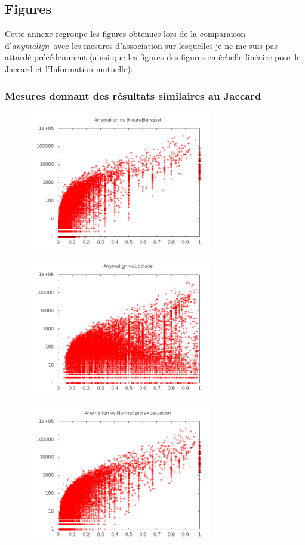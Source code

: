 \documentclass[a4paper,10pt]{article}
\newcommand{\anym}{\emph{anymalign}}
\begin{document}
\subsection{Figures}

Cette annexe regroupe les figures obtenues lors de la comparaison d'\anym~avec les mesures d'association sur lesquelles je ne me suis pas attardé précédemment (ainsi que les figures des figures en échelle linéaire pour le Jaccard et l'Information mutuelle).

\subsubsection{Mesures donnant des résultats similaires au Jaccard}
\label{commejaccard}

\begin{figure}[!h]
\centering
\includegraphics[width=8cm]{brawnblog.png}
\end{figure}

\begin{figure}[!h]
\centering
\includegraphics[width=8cm]{laplacelog.png}
\end{figure}

\begin{figure}[!h]
\centering
\includegraphics[width=8cm]{nexplog.png}
\end{figure}
\end{document}
